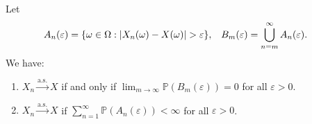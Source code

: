 \documentclass{huhtakm-template-book-v2}
\newcommand{\prob}{\mathbb{P}}
\begin{document}
    \begin{lem}
        \label{Chapter 8 (Lemma) Obtaining almost sure convergence}
        Let
        \begin{align*}
            A_{n}(\varepsilon) &= \{\omega \in \Omega:\left|{X_{n}(\omega)-X(\omega)}\right| > \varepsilon\}, & B_{m}(\varepsilon) &= \bigcup_{n = m}^{\infty}A_{n}(\varepsilon).
        \end{align*}
        We have:
        \begin{enumerate}
            \item $X_{n} \xrightarrow{\text{a.s.}} X$ if and only if $\lim_{m \to \infty}\prob(B_{m}(\varepsilon)) = 0$ for all $\varepsilon > 0$.
            \item $X_{n} \xrightarrow{\text{a.s.}} X$ if $\sum_{n = 1}^{\infty}\prob(A_{n}(\varepsilon)) < \infty$ for all $\varepsilon > 0$.
        \end{enumerate}
    \end{lem}
\end{document}
